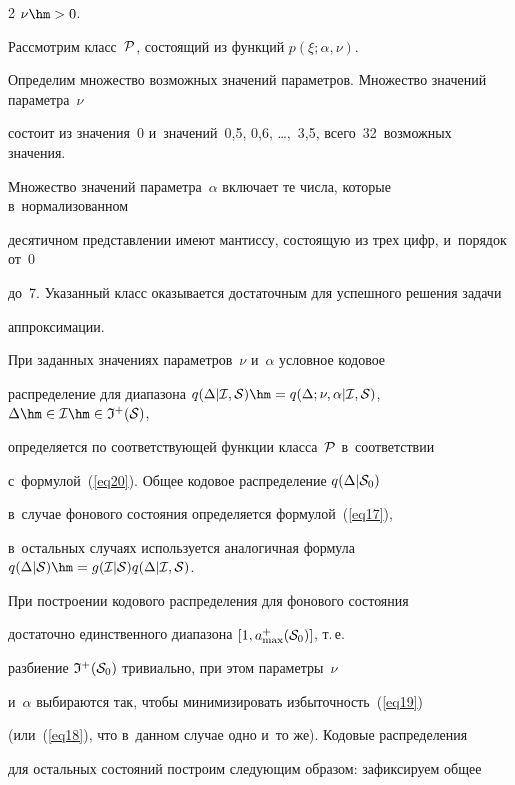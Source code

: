 \begin{multicols}{2}
$\nu\hm> 0$.







Рассмотрим класс~${\cal P}$, состоящий из функций $p(\xi ;\alpha,\nu)$. 

Определим множество возможных значений параметров. Множество значений параметра~$\nu$ 

состоит из значения~0 и~значений~0,5, 0,6, \ldots,~3,5, всего~32~возможных значения. 

Множество значений параметра~$\alpha$ включает те числа, которые в~нормализованном 

десятичном представлении имеют мантиссу, состоящую из трех цифр, и~порядок от~0 

до~7. Указанный класс оказывается достаточным для успешного решения задачи 

аппроксимации.



При заданных значениях параметров~$\nu$ и~$\alpha$  условное кодовое 

распределение для диапазона $q(\Delta|{\cal I},{\cal S}) \hm= 

q(\Delta;\nu,\alpha|{\cal I},{\cal S})$, $\Delta\hm\in{\cal I}\hm\in{\frak I}^+({\cal S})$, 

определяется по соответствующей функции класса~${\cal P}$  в~соответствии 

с~формулой~(\ref{eq20}). Общее кодовое распределение $q(\Delta|{\cal S}_0)$ 

в~случае фонового со\-сто\-яния определяется формулой~(\ref{eq17}), 

в~остальных случаях используется аналогичная формула $q(\Delta|{\cal S})\hm= 

g({\cal I}|{\cal S})q(\Delta|{\cal I},{\cal S})$.



При построении кодового распределения для фонового состояния 

достаточно единственного диапазона $[1,a_{\max}^+({\cal S}_0)]$, т.\,е.\

 разбиение ${\frak I}^+({\cal S}_0)$ тривиально, при этом параметры~$\nu$ 

 и~$\alpha$  выбираются так, чтобы минимизировать избыточность~(\ref{eq19}) 

 (или~(\ref{eq18}), что в~данном случае одно и~то же). Кодовые распределения 

 для остальных состояний построим следующим образом: зафиксируем общее 


\end{multicols}
